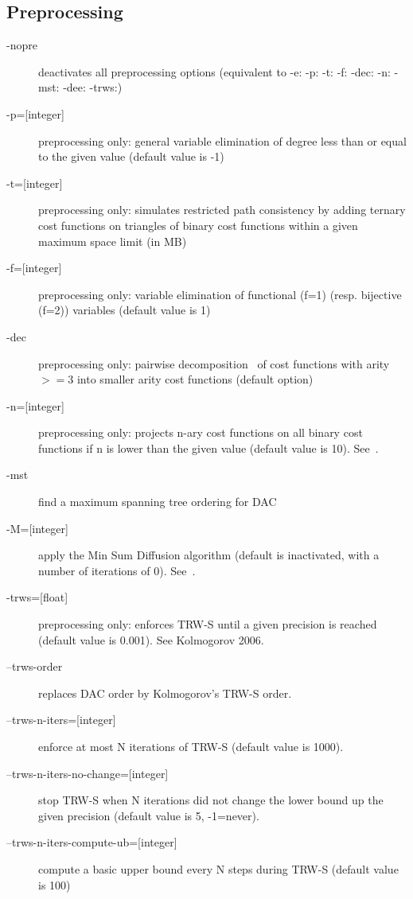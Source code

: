 \documentclass{article}
\begin{document}
\subsection{Preprocessing}

\begin{description}
\item[{-nopre}] deactivates all preprocessing options (equivalent to -e:
  -p: -t: -f: -dec: -n: -mst: -dee: -trws:)
\item[{-p=[integer]}]preprocessing only: general variable elimination
  of degree less than or equal to the given value (default value is
  -1)
\item[{-t=[integer]}] preprocessing only: simulates restricted path
  consistency by adding ternary cost functions on triangles of binary
  cost functions within a given maximum space limit (in MB)
\item[{-f=[integer]}] preprocessing only: variable elimination of
  functional (f=1) (resp. bijective (f=2)) variables (default value is
  1)
\item[{-dec}] preprocessing only: pairwise decomposition~\cite{Favier11a} of cost
  functions with arity $>=3$ into smaller arity cost functions (default
  option)
\item[{-n=[integer]}] preprocessing only: projects n-ary cost functions
  on all binary cost functions if n is lower than the given value
  (default value is 10). See~\cite{Favier11a}.
\item[{-mst}] find a maximum spanning tree ordering for DAC
\item[{-M=[integer]}]
  apply the Min Sum Diffusion algorithm (default is inactivated, with
  a number of iterations of 0). See~\cite{Cooper10a}.
\item[{-trws=[float]}] 
  preprocessing only: enforces TRW-S until a given precision is reached (default value is 0.001). See Kolmogorov 2006.
\item[{--trws-order}] replaces DAC order by Kolmogorov's TRW-S order. 
\item[{--trws-n-iters=[integer]}] enforce at most N iterations of TRW-S (default value is 1000).
\item[{--trws-n-iters-no-change=[integer]}] stop TRW-S when N iterations did not change the lower bound up the given precision (default value is 5, -1=never).
\item[{--trws-n-iters-compute-ub=[integer]}] compute a basic upper bound every N steps during TRW-S (default value is 100)
 \end{description}
\end{document}
